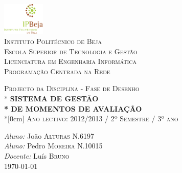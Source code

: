 \begin{titlepage}

\begin{center}

\includegraphics[width=0.15\textwidth]{logo.png}\\[1cm]    


\textsc{\LARGE Instituto Politécnico de Beja\\Escola Superior de Tecnologia e Gestão}\\[1.5cm]
\textsc{Licenciatura em Engenharia Informática}\\
\textsc{Programação Centrada na Rede}




\vspace*{\fill}
\textsc{Projecto da Disciplina - Fase de Desenho}\\*
{\huge \bfseries SISTEMA DE GESTÃO\\*
 \bfseries DE MOMENTOS DE AVALIAÇÃO}\\*[0cm]
\textsc{Ano lectivo: 2012/2013 / 2º Semestre / 3º ano}
\vspace*{\fill}


\vfill

{
\emph{Aluno:} João \textsc{Alturas} N.6197\\
\emph{Aluno:} Pedro \textsc{Moreira} N.10015\\



\emph{Docente:} Luís \textsc{Bruno}
\\

\large \today

}

\end{center}
\end{titlepage}
